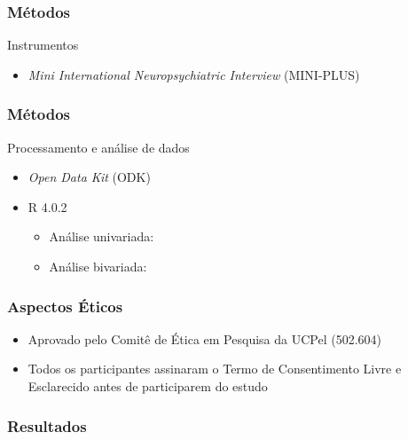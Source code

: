 \documentclass{beamer}
\begin{document}
\begin{frame}
\frametitle{Métodos}

    \begin{block}{Instrumentos}
        \begin{itemize}
            \item \emph{Mini International Neuropsychiatric Interview} (MINI-PLUS)
        \end{itemize}
    \end{block}

\end{frame}

\begin{frame}
\frametitle{Métodos}

    \begin{block}{Processamento e análise de dados}
        \begin{itemize}
            \item \emph{Open Data Kit} (ODK)        
            \item R 4.0.2
            \begin{itemize}
                \item Análise univariada: 
                \item Análise bivariada: 
            \end{itemize}
        \end{itemize}
    \end{block}

\end{frame}

\begin{frame}
\frametitle{Aspectos Éticos}
    \Large
    \begin{itemize}
        \item Aprovado pelo Comitê de Ética em Pesquisa da UCPel (502.604)
        \item Todos os participantes assinaram o Termo de Consentimento Livre e Esclarecido antes de participarem do estudo
    \end{itemize}

\end{frame}

\begin{frame}
\frametitle{Resultados}



\end{frame} 
\begin{frame}

\end{frame}
\end{document}
